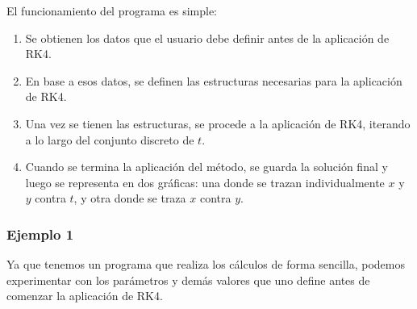 \documentclass[12pt, a4paper]{article}
\begin{document}
El funcionamiento del programa es simple:
\begin{enumerate}
    \item Se obtienen los datos que el usuario debe definir antes de la aplicación de RK4.
    \item En base a esos datos, se definen las estructuras necesarias para la aplicación de RK4.
    \item Una vez se tienen las estructuras, se procede a la aplicación de RK4, iterando a lo largo del conjunto discreto de \(t\).
    \item Cuando se termina la aplicación del método, se guarda la solución final y luego se representa en dos gráficas: una donde se trazan individualmente \(x\) y \(y\) contra \(t\), y otra donde se traza \(x\) contra \(y\).
\end{enumerate}

\subsubsection{Ejemplo 1}

Ya que tenemos un programa que realiza los cálculos de forma sencilla, podemos experimentar con los parámetros y demás valores que uno define antes de comenzar la aplicación de RK4.
\end{document}
